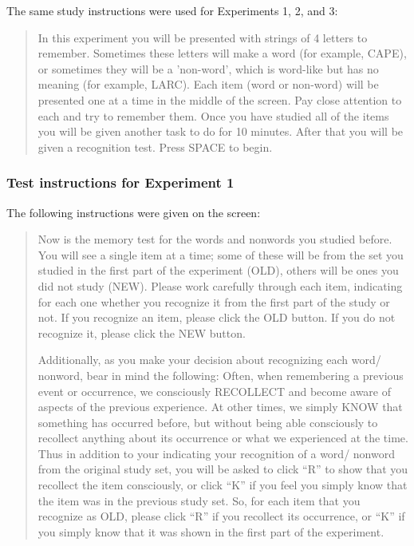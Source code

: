 \documentclass[english,,man,floatsintext]{apa6}
\begin{document}
The same study instructions were used for Experiments 1, 2, and 3:

\begin{quote}In this experiment you will be presented with strings of 4 letters to remember. Sometimes these letters will make a word (for example, CAPE), or sometimes they will be a 'non-word', which is word-like but has no meaning (for example, LARC). Each item (word or non-word) will be presented one at a time in the middle of the screen. Pay close attention to each and try to remember them. Once you have studied all of the items you will be given another task to do for 10 minutes. After that you will be given a recognition test. Press SPACE to begin.
\end{quote}

\hypertarget{test-instructions-for-experiment-1}{%
\subsubsection{Test instructions for Experiment 1}\label{test-instructions-for-experiment-1}}

The following instructions were given on the screen:

\begin{quote}Now is the memory test for the words and nonwords you studied before. You will
see a single item at a time; some of these will be from the set you studied in the first
part of the experiment (OLD), others will be ones you did not study (NEW). Please
work carefully through each item, indicating for each one whether you recognize it
from the first part of the study or not. If you recognize an item, please click the
OLD button. If you do not recognize it, please click the NEW button. 

Additionally, as you make your decision about recognizing each word/ nonword, bear
in mind the following: Often, when remembering a previous event or occurrence, we
consciously RECOLLECT and become aware of aspects of the previous experience. At
other times, we simply KNOW that something has occurred before, but without being
able consciously to recollect anything about its occurrence or what we experienced at
the time. 
Thus in addition to your indicating your recognition of a word/ nonword from the
original study set, you will be asked to click ``R” to show that you recollect the item
consciously, or click ``K” if you feel you simply know that the item was in the previous
study set. So, for each item that you recognize as OLD, please click ``R” if you
recollect its occurrence, or ``K” if you simply know that it was shown in the first part
of the experiment.
\end{quote}
\end{document}
